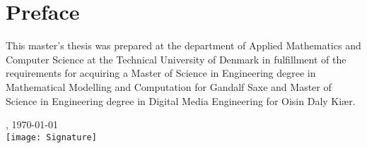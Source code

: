 \chapter{Preface}
This master's thesis was prepared at the department of Applied Mathematics and Computer Science at the Technical University of Denmark in fulfillment of the requirements for acquiring a Master of Science in Engineering degree in Mathematical Modelling and Computation for Gandalf Saxe and Master of Science in Engineering degree in Digital Media Engineering for Oisin Daly Kiær.

\vfill
{}
{
\centering
    \thesislocation{}, \today\\[1cm]
    \hspace{3cm}\texttt{[image: Signature]}\\[1cm]
\begin{flushright}
    \thesisauthor{}
\end{flushright}
}